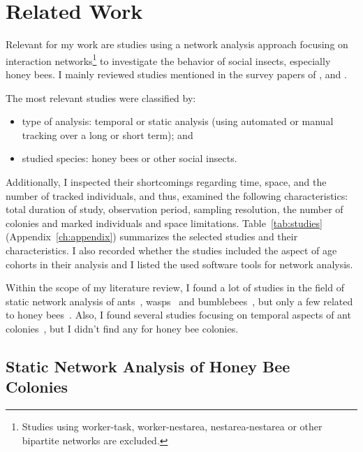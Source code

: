\chapter{Related Work}
\label{ch:relatedwork}

Relevant for my work are studies using a network analysis approach focusing on interaction networks\footnote{Studies using worker-task, worker-nestarea, nestarea-nestarea or other bipartite networks are excluded.} to investigate the behavior of social insects, especially honey bees.
I mainly reviewed studies mentioned in the survey papers of \textcite{Pinter-Wollman2014}, \textcite[chapter~15]{krause2014animal} and \textcite{charbonneau2013social}.

The most relevant studies were classified by:

\begin{itemize}
\item type of analysis: temporal or static analysis (using automated or manual tracking over a long or short term); and
\item studied species: honey bees or other social insects.
\end{itemize}

Additionally, I inspected their shortcomings regarding time, space, and the number of tracked individuals, and thus, examined the following characteristics: total duration of study, observation period, sampling resolution, the number of colonies and marked individuals and space limitations.
Table~\ref{tab:studies} (Appendix~\ref{ch:appendix}) summarizes the selected studies and their characteristics.
I also recorded whether the studies included the aspect of age cohorts in their analysis and I listed the used software tools for network analysis.


Within the scope of my literature review, I found a lot of studies in the field of static network analysis of ants~\cite{greenwald2015ant,pinter2011effect,quevillon2015social,formica2012fitness,waters2012information,sendova2010emergency}, wasps~\cite{naug2009structure} and bumblebees~\cite{otterstatter2007contact}, but only a few related to honey bees~\cite{baracchi2014socio,naug2008structure,scholl2011olfactory,naug2007experimentally}.
Also, I found several studies focusing on temporal aspects of ant colonies~\cite{mersch2013tracking,blonder2011time,jeanson2012long}, but I didn't find any for honey bee colonies.


\section{Static Network Analysis of Honey Bee Colonies}

